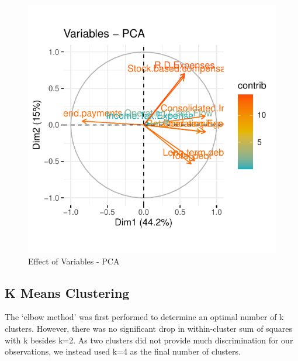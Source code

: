 \documentclass[11pt,]{article}
\begin{document}
\begin{figure}

{\centering \includegraphics{stock_analysis_files/figure-latex/PCAvar-1} 

}

\caption{Effect of Variables - PCA}\label{fig:PCAvar}
\end{figure}

\hypertarget{k-means-clustering}{%
\subsection{K Means Clustering}\label{k-means-clustering}}

The `elbow method' was first performed to determine an optimal number of
k clusters. However, there was no significant drop in within-cluster sum
of squares with k besides k=2. As two clusters did not provide much
discrimination for our observations, we instead used k=4 as the final
number of clusters.
\end{document}
